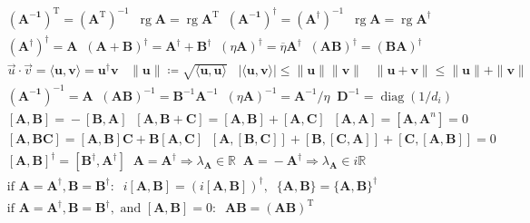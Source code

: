 \begin{align*}
&(\mathbf{A^{-1}})^{\operatorname{T}}\!=\!(\mathbf{A}^{\operatorname{T}})^{-1}\;\;\operatorname{rg}\mathbf{A}\!=\!\operatorname{rg}\mathbf{A}^{\operatorname{T}}\;\;(\mathbf{A^{-1}})^\dagger\!=\!(\mathbf{A}^\dagger)^{-1}\;\;\operatorname{rg}\mathbf{A}\!=\!\operatorname{rg}\mathbf{A}^\dagger \\
&(\mathbf{A}^\dagger)^\dagger\!=\!\mathbf{A}\;\;(\mathbf{A\!+\!B})^\dagger\!=\!\mathbf{A}^\dagger\!+\!\mathbf{B}^\dagger\;\;(\eta\mathbf{A})^\dagger\!=\!\overline{\eta}\mathbf{A}^\dagger\;\;(\mathbf{AB})^\dagger\!=\!(\mathbf{BA})^\dagger \\
&\vec{u}\cdot\vec{v}\!=\!\langle\mathbf{u},\mathbf{v}\rangle\!=\!\mathbf{u}^\dagger\mathbf{v}\; \; \; \|\mathbf{u}\|\coloneqq\sqrt{\langle \mathbf{u},\mathbf{u} \rangle}\; \;  \; |\langle  \mathbf{u}, \mathbf{v} \rangle|\leq \|\mathbf{u}\|\|\mathbf{v}\| \; \; \; \|\mathbf{u}+\mathbf{v}\|\leq\|\mathbf{u}\|+\|\mathbf{v}\|\\
&(\mathbf{A^{-1}})^{-1}\!=\!\mathbf{A}\;\;(\mathbf{AB})^{-1}\!=\!\mathbf{B}^{-1}\mathbf{A}^{-1}\;\;(\eta\mathbf{A})^{-1}\!=\!\mathbf{A}^{-1}\!/\eta\;\;\mathbf{D}^{-1}\!=\!\operatorname{diag}(1/d_i) \\
&[\mathbf{A},\mathbf{B}]\!=\!-[\mathbf{B},\mathbf{A}]\;\;[\mathbf{A},\mathbf{B\!+\!C}]\!=\![\mathbf{A},\mathbf{B}]\!+\![\mathbf{A},\mathbf{C}]\;\;[\mathbf{A},\mathbf{A}]\!=\!
[\mathbf{A},\mathbf{A}^n]\!=\!0 \\
&[\mathbf{A},\mathbf{BC}]\!=\![\mathbf{A},\mathbf{B}]\mathbf{C}\!+\!\mathbf{B}[\mathbf{A},\mathbf{C}]\;\;[\mathbf{A},[\mathbf{B},\mathbf{C}]]\!+\![\mathbf{B},[\mathbf{C},\mathbf{A}]]\!+\![\mathbf{C},[\mathbf{A},\mathbf{B}]]\!=\!0 \\
 &[\mathbf{A},\mathbf{B}]^\dagger\!=\![\mathbf{B}^\dagger,\mathbf{A}^\dagger]\;\;\mathbf{A}\!=\!\mathbf{A}^\dagger\!\Rightarrow\!\lambda_\mathbf{A}\!\in\!\mathbb{R}\;\;\mathbf{A}\!=\!-\mathbf{A}^\dagger\!\Rightarrow\!\lambda_\mathbf{A}\!\in\!i\mathbb{R} \\
&\text{if }\mathbf{A}\!=\!\mathbf{A}^\dagger,\mathbf{B}\!=\!\mathbf{B}^\dagger\!:\;\;i[\mathbf{A},\mathbf{B}]\!=\!(i[\mathbf{A},\mathbf{B}])^\dagger,\;\;\{\mathbf{A},\mathbf{B}\}\!=\!\{\mathbf{A},\mathbf{B}\}^\dagger \\
&\text{if }\mathbf{A}\!=\!\mathbf{A}^\dagger,\mathbf{B}\!=\!\mathbf{B}^\dagger,\text{ and }[\mathbf{A},\mathbf{B}]\!=\!0\!:\;\;\mathbf{AB}\!=\!(\mathbf{AB})^{\operatorname{T}}    
\end{align*}







